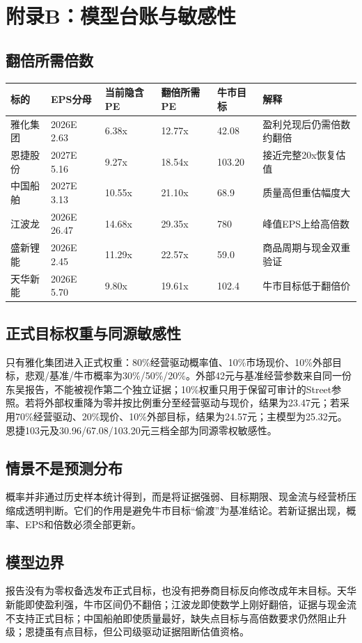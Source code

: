 \chapter{附录B：模型台账与敏感性}

\section{翻倍所需倍数}

\begin{exhibitbox}
\small
\begin{tabularx}{\exhibitboxwidth}{L{2.4cm} R{1.6cm} R{1.6cm} R{1.7cm} R{1.7cm} X}
\toprule
标的 & EPS分母 & 当前隐含PE & 翻倍所需PE & 牛市目标 & 解释 \\
\midrule
雅化集团 & 2026E 2.63 & 6.38x & 12.77x & 42.08 & 盈利兑现后仍需倍数约翻倍 \\
恩捷股份 & 2027E 5.16 & 9.27x & 18.54x & 103.20 & 接近完整20x恢复估值 \\
中国船舶 & 2027E 3.13 & 10.55x & 21.10x & 68.9 & 质量高但重估幅度大 \\
江波龙 & 2026E 26.47 & 14.68x & 29.35x & 780 & 峰值EPS上给高倍数 \\
盛新锂能 & 2026E 2.45 & 11.29x & 22.57x & 59.0 & 商品周期与现金双重验证 \\
天华新能 & 2026E 5.70 & 9.80x & 19.61x & 102.4 & 牛市目标低于翻倍价 \\
\bottomrule
\end{tabularx}
\end{exhibitbox}

\section{正式目标权重与同源敏感性}

只有雅化集团进入正式权重：80\%经营驱动概率值、10\%市场现价、10\%外部目标，悲观/基准/牛市概率为30\%/50\%/20\%。外部42元与基准经营参数来自同一份东吴报告，不能被视作第二个独立证据；10\%权重只用于保留可审计的Street参照。若将外部权重降为零并按比例重分至经营驱动与现价，结果为23.47元；若采用70\%经营驱动、20\%现价、10\%外部目标，结果为24.57元；主模型为25.32元。恩捷103元及30.96/67.08/103.20元三档全部为同源零权敏感性。

\section{情景不是预测分布}

概率并非通过历史样本统计得到，而是将证据强弱、目标期限、现金流与经营桥压缩成透明判断。它们的作用是避免牛市目标“偷渡”为基准结论。若新证据出现，概率、EPS和倍数必须全部更新。

\section{模型边界}

报告没有为零权备选发布正式目标，也没有把券商目标反向修改成年末目标。天华新能即使盈利强，牛市区间仍不翻倍；江波龙即使数学上刚好翻倍，证据与现金流不支持正式目标；中国船舶即使质量最好，缺失点目标与高倍数要求仍然阻止升级；恩捷虽有点目标，但公司级驱动证据阻断估值资格。

\clearpage
